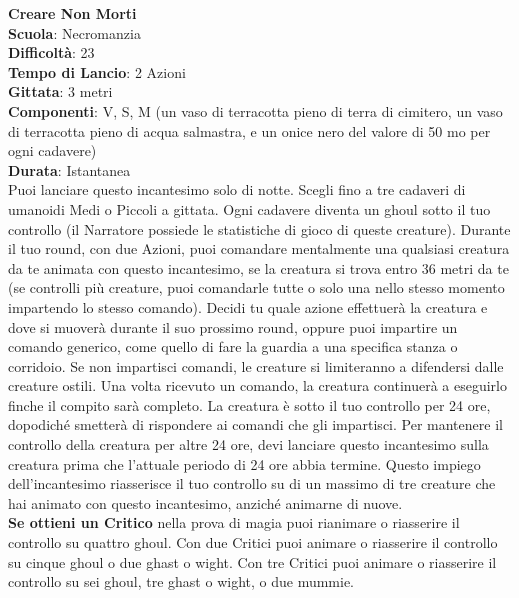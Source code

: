 \begin{multicols}{2}
\medskip\textbf{Creare Non Morti}\\
\textbf{Scuola}: Necromanzia\\
\textbf{Difficoltà}: 23\\
\textbf{Tempo di Lancio}: 2 Azioni\\
\textbf{Gittata}: 3 metri\\
\textbf{Componenti}: V, S, M (un vaso di terracotta pieno di terra di cimitero, un vaso di terracotta pieno di acqua salmastra, e un onice nero del valore di 50 mo per ogni cadavere)\\
\textbf{Durata}: Istantanea\\
Puoi lanciare questo incantesimo solo di notte. Scegli fino a tre cadaveri di umanoidi Medi o Piccoli a gittata. Ogni cadavere diventa un ghoul sotto il tuo controllo (il Narratore possiede le statistiche di gioco di queste creature). Durante il tuo round, con due Azioni, puoi comandare mentalmente una qualsiasi creatura da te animata con questo incantesimo, se la creatura si trova entro 36 metri da te (se controlli più creature, puoi comandarle tutte o solo una nello stesso momento impartendo lo stesso comando). Decidi tu quale azione effettuerà la creatura e dove si muoverà durante il suo prossimo round, oppure puoi impartire un comando generico, come quello di fare la guardia a una specifica stanza o corridoio. Se non impartisci comandi, le creature si limiteranno a difendersi dalle creature ostili. Una volta ricevuto un comando, la creatura continuerà a eseguirlo finche il compito sarà completo. La creatura è sotto il tuo controllo per 24 ore, dopodiché smetterà di rispondere ai comandi che gli impartisci. Per mantenere il controllo della creatura per altre 24 ore, devi lanciare questo incantesimo sulla creatura prima che l'attuale periodo di 24 ore abbia termine. Questo impiego dell'incantesimo riasserisce il tuo controllo su di un massimo di tre creature che hai animato con questo incantesimo, anziché animarne di nuove.\\
\textbf{Se ottieni un Critico} nella prova di magia puoi rianimare o riasserire il controllo su quattro ghoul. Con due Critici puoi animare o riasserire il controllo su cinque
ghoul o due ghast o wight. Con tre Critici puoi animare o riasserire il controllo su sei ghoul, tre ghast o wight, o due mummie. 


\end{multicols}
